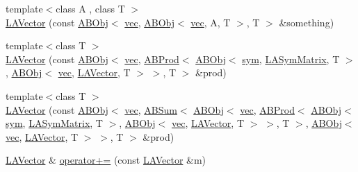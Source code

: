 \begin{DoxyCompactItemize}
\item 
{\footnotesize template$<$class A , class T $>$ }\\\mbox{\hyperlink{classROOT_1_1Minuit2_1_1LAVector_a54c383b901e8645fac3eadba655ca13c}{L\+A\+Vector}} (const \mbox{\hyperlink{classROOT_1_1Minuit2_1_1ABObj}{A\+B\+Obj}}$<$ \mbox{\hyperlink{classROOT_1_1Minuit2_1_1vec}{vec}}, \mbox{\hyperlink{classROOT_1_1Minuit2_1_1ABObj}{A\+B\+Obj}}$<$ \mbox{\hyperlink{classROOT_1_1Minuit2_1_1vec}{vec}}, A, T $>$, T $>$ \&something)
\item 
{\footnotesize template$<$class T $>$ }\\\mbox{\hyperlink{classROOT_1_1Minuit2_1_1LAVector_a5406d6981c46d18b7b939a18ff9d6a5d}{L\+A\+Vector}} (const \mbox{\hyperlink{classROOT_1_1Minuit2_1_1ABObj}{A\+B\+Obj}}$<$ \mbox{\hyperlink{classROOT_1_1Minuit2_1_1vec}{vec}}, \mbox{\hyperlink{classROOT_1_1Minuit2_1_1ABProd}{A\+B\+Prod}}$<$ \mbox{\hyperlink{classROOT_1_1Minuit2_1_1ABObj}{A\+B\+Obj}}$<$ \mbox{\hyperlink{classROOT_1_1Minuit2_1_1sym}{sym}}, \mbox{\hyperlink{classROOT_1_1Minuit2_1_1LASymMatrix}{L\+A\+Sym\+Matrix}}, T $>$, \mbox{\hyperlink{classROOT_1_1Minuit2_1_1ABObj}{A\+B\+Obj}}$<$ \mbox{\hyperlink{classROOT_1_1Minuit2_1_1vec}{vec}}, \mbox{\hyperlink{classROOT_1_1Minuit2_1_1LAVector}{L\+A\+Vector}}, T $>$ $>$, T $>$ \&prod)
\item 
{\footnotesize template$<$class T $>$ }\\\mbox{\hyperlink{classROOT_1_1Minuit2_1_1LAVector_ab334afbd4bfe63882b9daa857f70a9f2}{L\+A\+Vector}} (const \mbox{\hyperlink{classROOT_1_1Minuit2_1_1ABObj}{A\+B\+Obj}}$<$ \mbox{\hyperlink{classROOT_1_1Minuit2_1_1vec}{vec}}, \mbox{\hyperlink{classROOT_1_1Minuit2_1_1ABSum}{A\+B\+Sum}}$<$ \mbox{\hyperlink{classROOT_1_1Minuit2_1_1ABObj}{A\+B\+Obj}}$<$ \mbox{\hyperlink{classROOT_1_1Minuit2_1_1vec}{vec}}, \mbox{\hyperlink{classROOT_1_1Minuit2_1_1ABProd}{A\+B\+Prod}}$<$ \mbox{\hyperlink{classROOT_1_1Minuit2_1_1ABObj}{A\+B\+Obj}}$<$ \mbox{\hyperlink{classROOT_1_1Minuit2_1_1sym}{sym}}, \mbox{\hyperlink{classROOT_1_1Minuit2_1_1LASymMatrix}{L\+A\+Sym\+Matrix}}, T $>$, \mbox{\hyperlink{classROOT_1_1Minuit2_1_1ABObj}{A\+B\+Obj}}$<$ \mbox{\hyperlink{classROOT_1_1Minuit2_1_1vec}{vec}}, \mbox{\hyperlink{classROOT_1_1Minuit2_1_1LAVector}{L\+A\+Vector}}, T $>$ $>$, T $>$, \mbox{\hyperlink{classROOT_1_1Minuit2_1_1ABObj}{A\+B\+Obj}}$<$ \mbox{\hyperlink{classROOT_1_1Minuit2_1_1vec}{vec}}, \mbox{\hyperlink{classROOT_1_1Minuit2_1_1LAVector}{L\+A\+Vector}}, T $>$ $>$, T $>$ \&prod)
\item 
\mbox{\hyperlink{classROOT_1_1Minuit2_1_1LAVector}{L\+A\+Vector}} \& \mbox{\hyperlink{classROOT_1_1Minuit2_1_1LAVector_ae560b2a352c80542c2333a68bc9c3b68}{operator+=}} (const \mbox{\hyperlink{classROOT_1_1Minuit2_1_1LAVector}{L\+A\+Vector}} \&m)

\end{DoxyCompactItemize}
